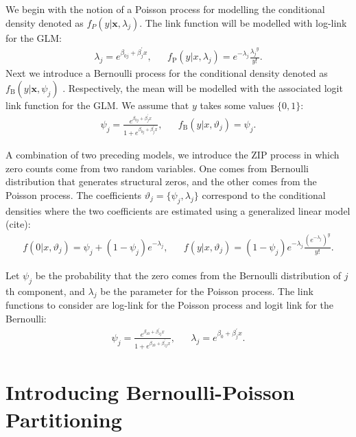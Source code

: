 \documentclass[11pt,letterpaper]{article}
\numberwithin{equation}{section}
\numberwithin{equation}{section}
\numberwithin{equation}{section}
\begin{document}
We begin with the notion of a Poisson process for modelling the conditional density denoted as $ f_P(y|\bm{x},\lambda_j) $. The link function will be modelled with log-link for the GLM:
 \begin{align*}
\lambda_j = e^{\beta_{0j} + \beta_j^{'}x}, &&
f_{\text{P}}(y|  x,\lambda_{j} ) = e^{-\lambda_j} \frac{{\lambda_j}^y}{y!}.
 \end{align*}
Next we introduce a Bernoulli process for the conditional density denoted as  $ f_{\text{B}}(y|\bm{x},\psi_j) $ . Respectively, the mean will be modelled with the associated logit link function for the GLM.  We assume that $y$ takes some values $\{0, 1\}$:
 \begin{align*}
 \psi_j =  \frac{e^{\beta_{0j} + \beta_{j}^{'} x}}{1+ e^{\beta_{0j} + \beta_{j}^{'} x}},  &&
 f_{\text{B}}(y | x,\vartheta_{j}) = \psi_j. 
 \end{align*}

 A combination of two preceding models, we introduce the ZIP process in which zero counts come from two random variables. One comes from Bernoulli distribution that generates structural zeros, and the other comes from the Poisson process. The coefficients $ \vartheta_{j} =  \{\psi_j  ,  \lambda_j \} $ correspond to the conditional densities where the two coefficients are estimated using a generalized linear model (cite): %
 \begin{align*}
 f(0 | x,\vartheta_{j}) = \psi_j + (1 - \psi_j)e^{-\lambda_j},  &&
f(y|  x,\vartheta_{j} ) = (1 - \psi_j)e^{-\lambda_j} \frac{\left(e^{-\lambda_j}\right)^y  }{y!}.  
 \end{align*}

Let $\psi_j$ be the probability that the zero comes from the Bernoulli distribution of $j$th component, and $ \lambda_j $ be the parameter for the Poisson process.   The link functions to consider are log-link for the Poisson process and logit link for the Bernoulli:
 \begin{align*}
\psi_j =  \frac{e^{\beta_{z0} + \beta_{zj}^{'} x}}{1+ e^{\beta_{z0} + \beta_{zj}^{'} x}}, &&
\lambda_j = e^{\beta_0 + \beta_j^{'}x}.
 \end{align*}

\section{Introducing Bernoulli-Poisson Partitioning}
\end{document}
